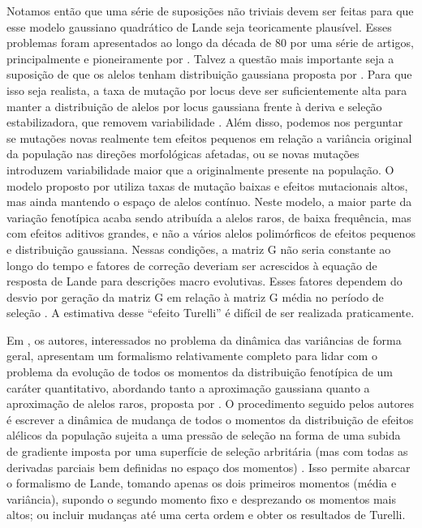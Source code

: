 Notamos então que uma série de suposições não triviais devem ser feitas
para que esse modelo gaussiano quadrático de Lande seja teoricamente
plausível. 
Esses problemas foram apresentados ao longo da década de 80 por uma
série de artigos, principalmente e pioneiramente por \cite{Turelli1984,
Turelli1985, Turelli1986, Barton1987, Barton1989}. 
Talvez a questão mais importante seja a suposição de que os alelos
tenham distribuição gaussiana proposta por \cite{Kimura1965}. 
Para que isso seja realista, a taxa de mutação por locus deve ser
suficientemente alta para manter a distribuição de alelos por locus
gaussiana frente à deriva e seleção estabilizadora, que removem
variabilidade \citep{Falconer1996}. 
Além disso, podemos nos perguntar se mutações novas realmente tem efeitos
pequenos em relação a variância original da população nas direções
morfológicas afetadas, ou se novas mutações introduzem variabilidade
maior que a originalmente presente na população. 
O modelo proposto por \cite{Turelli1984} utiliza taxas de mutação
baixas e efeitos mutacionais altos, mas ainda mantendo o espaço de
alelos contínuo. 
Neste modelo, a maior parte da variação fenotípica acaba sendo atribuída
a alelos raros, de baixa frequência, mas com efeitos aditivos grandes, e
não a vários alelos polimórficos de efeitos pequenos e distribuição
gaussiana. 
Nessas condições, a matriz G não seria constante ao longo do tempo e
fatores de correção deveriam ser acrescidos à equação de resposta de
Lande para descrições macro evolutivas. 
Esses fatores dependem do desvio por geração da matriz G em relação à
matriz G média no período de seleção \citep{Jones2004}. 
A estimativa desse ``efeito Turelli'' é difícil de ser realizada
praticamente. 

Em \cite{Barton1987}, os autores, interessados no problema da dinâmica
das variâncias de forma geral, apresentam um formalismo relativamente
completo para lidar com o problema da evolução de todos os momentos da
distribuição fenotípica de um caráter quantitativo, abordando tanto a
aproximação gaussiana quanto a aproximação de alelos raros, proposta por
\cite{Turelli1984}. 
O procedimento seguido pelos autores é escrever a dinâmica de mudança de
todos o momentos da distribuição de efeitos alélicos da população
sujeita a uma pressão de seleção na forma de uma subida de gradiente
imposta por uma superfície de seleção arbritária (mas com todas as
derivadas parciais bem definidas no espaço dos momentos)
\citep{Arnold2001a}. 
Isso permite abarcar o formalismo de Lande, tomando apenas os dois
primeiros momentos (média e variância), supondo o segundo momento fixo e
desprezando os momentos mais altos; ou incluir mudanças até uma certa
ordem e obter os resultados de Turelli. 

